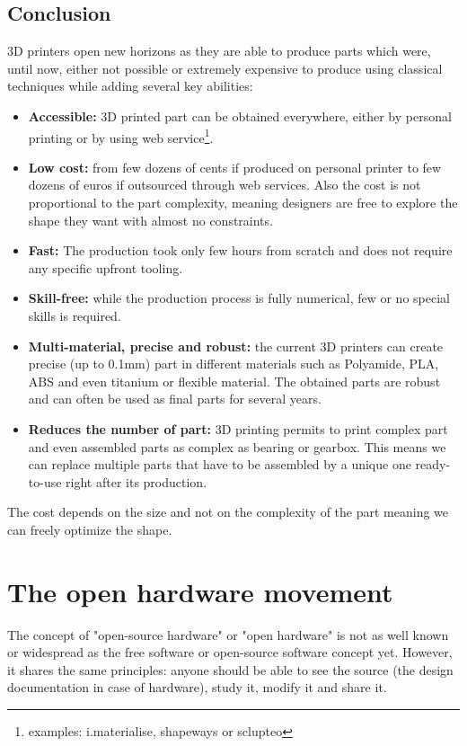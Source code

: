 \subsection{Conclusion} %

3D printers open new horizons as they are able to produce parts which were, until now, either not possible or extremely expensive to produce using classical techniques while adding several key abilities:
\begin{itemize}
    \item \textbf{Accessible:} 3D printed part can be obtained everywhere, either by personal printing or by using web service\footnote{examples: i.materialise, shapeways or sclupteo}.
    \item \textbf{Low cost:}  from few dozens of cents if produced on personal printer to few dozens of euros if outsourced through web services. Also the cost is not proportional to the part complexity, meaning designers are free to explore the shape they want with almost no constraints.
    \item \textbf{Fast:} The production took only few hours from scratch and does not require any specific upfront tooling.
    \item \textbf{Skill-free:} while the production process is fully numerical, few or no special skills is required.
    \item \textbf{Multi-material, precise and robust:} the current 3D printers can create precise (up to 0.1mm) part in different materials such as Polyamide, PLA, ABS and even titanium or flexible material. The obtained parts are robust and can often be used as final parts for several years.
    \item \textbf{Reduces the number of part:} 3D printing permits to print complex part and even assembled parts as complex as bearing or gearbox. This means we can replace multiple parts that have to be assembled by a unique one ready-to-use right after its production.
\end{itemize}



The cost depends on the size and not on the complexity of the part meaning we can freely optimize the shape.


\newpage
\section{The open hardware movement} %

The concept of "open-source hardware" or "open hardware" is not as well known or widespread as the free software or open-source software concept yet. However, it shares the same principles: anyone should be able to see the source (the design documentation in case of hardware), study it, modify it and share it.

